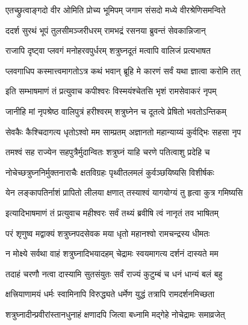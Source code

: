 
\twolineshloka
{एतच्छ्रुत्वाङ्गदो वीर ओमिति प्रोच्य भूमिपम्}
{जगाम संसदो मध्ये वीरश्रेणिसमन्विते}%

\twolineshloka
{ददर्श सुरथं भूपं तुलसीमञ्जरीधरम्}
{रामभद्रं रसनया ब्रुवन्तं सेवकान्निजान्}%

\twolineshloka
{राजापि दृष्ट्वा प्लवगं मनोहरवपुर्धरम्}
{शत्रुघ्नदूतं मत्वापि वालिजं प्रत्यभाषत}%


\twolineshloka
{प्लवगाधिप कस्मात्त्वमागतोऽत्र कथं भवान्}
{ब्रूहि मे कारणं सर्वं यथा ज्ञात्वा करोमि तत्}%


\twolineshloka
{इति सम्भाषमाणं तं प्रत्युवाच कपीश्वरः}
{विस्मयंश्चेतसि भृशं रामसेवाकरं नृपम्}%

\twolineshloka
{जानीहि मां नृपश्रेष्ठ वालिपुत्रं हरीश्वरम्}
{शत्रुघ्नेन च दूतत्वे प्रेषितो भवतोऽन्तिकम्}%

\twolineshloka
{सेवकैः कैश्चिदागत्य धृतोऽश्वो मम साम्प्रतम्}
{अज्ञानतो महान्याय्यं कुर्वद्भिः सहसा नृप}%

\twolineshloka
{तमश्वं सह राज्येन सहपुत्रैर्मुदान्वितः}
{शत्रुघ्नं याहि चरणे पतित्वाशु प्रदेहि च}%

\twolineshloka
{नोचेच्छत्रुघ्ननिर्मुक्तनाराचैः क्षतविग्रहः}
{पृथ्वीतलमलं कुर्वञ्छयिष्यसि विशीर्षकः}%

\twolineshloka
{येन लङ्कापतिर्नाशं प्रापितो लीलया क्षणात्}
{तस्याश्वं यागयोग्यं तु हृत्वा कुत्र गमिष्यसि}%


\twolineshloka
{इत्यादिभाषमाणं तं प्रत्युवाच महीश्वरः}
{सर्वं तथ्यं ब्रवीषि त्वं नानृतं तव भाषितम्}%

\twolineshloka
{परं शृणुष्व मद्वाक्यं शत्रुघ्नपदसेवक}
{मया धृतो महानश्वो रामचन्द्रस्य धीमतः}%

\twolineshloka
{न मोक्ष्ये सर्वथा वाहं शत्रुघ्नादिभयादहम्}
{चेद्रामः स्वयमागत्य दर्शनं दास्यते मम}%

\twolineshloka
{तदाहं चरणौ नत्वा दास्यामि सुतसंयुतः}
{सर्वं राज्यं कुटुम्बं च धनं धान्यं बलं बहु}%

\twolineshloka
{क्षत्त्रियाणामयं धर्मः स्वामिनापि विरुद्ध्यते}
{धर्मेण युद्धं तत्रापि रामदर्शनमिच्छता}%

\twolineshloka
{शत्रुघ्नादीन्प्रवीरांस्तानधुनाहं क्षणादपि}
{जित्वा बध्नामि मद्गेहे नोचेद्रामः समाव्रजेत्}%


